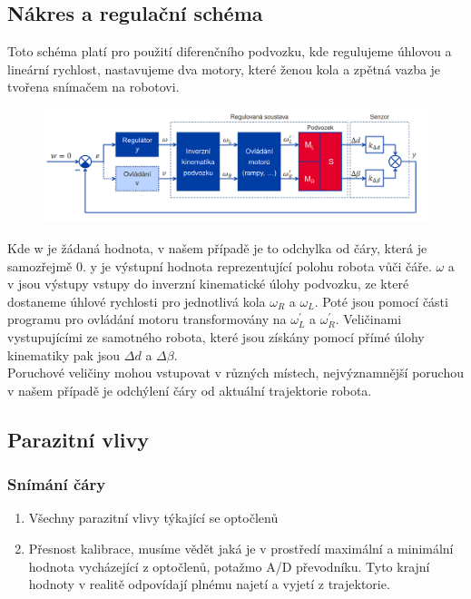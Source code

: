 \subsection{Nákres a regulační schéma}
Toto schéma platí pro použití diferenčního podvozku, kde regulujeme úhlovou a lineární rychlost, nastavujeme dva motory, které ženou kola a zpětná vazba je tvořena snímačem na robotovi.

\begin{figure}[h!]
    \centering
    \includegraphics[scale = 0.3]{img/RegSoust.png}
\end{figure}
Kde w je žádaná hodnota, v našem případě je to odchylka od čáry, která je samozřejmě 0. y je výstupní hodnota reprezentující polohu robota vůči čáře. \(\omega \) a v jsou výstupy vstupy do inverzní kinematické úlohy podvozku, ze které dostaneme úhlové rychlosti pro jednotlivá kola \(\omega_R\) a \(\omega_L\). Poté jsou pomocí části programu pro ovládání motoru transformovány na \(\omega_{L}^{'}\) a \(\omega_{R}^{'}\). Veličinami vystupujícími ze samotného robota, které jsou získány pomocí přímé úlohy kinematiky pak jsou \(\Delta d\) a \(\Delta \beta \).\\

Poruchové veličiny mohou vstupovat v různých místech, nejvýznamnější poruchou v našem případě je odchýlení čáry od aktuální trajektorie robota.\\

\subsection{Parazitní vlivy}
\subsubsection{Snímání čáry}
\begin{enumerate}
    \item Všechny parazitní vlivy týkající se optočlenů
    \item Přesnost kalibrace, musíme vědět jaká je v prostředí maximální a minimální hodnota vycházející z optočlenů, potažmo A/D převodníku. Tyto krajní hodnoty v realitě odpovídají plnému najetí a vyjetí z trajektorie.
\end{enumerate}

